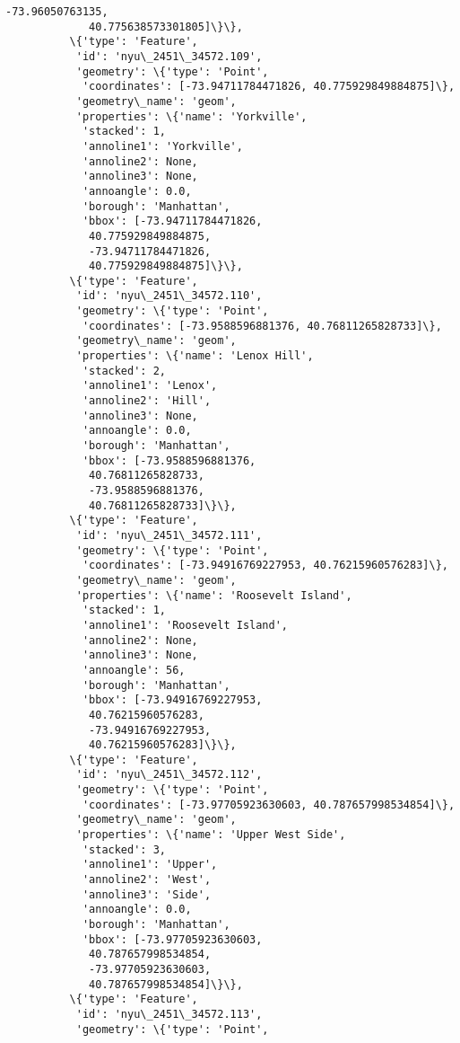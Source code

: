\documentclass[11pt]{article}
\begin{document}
\begin{Verbatim}[commandchars=\\\{\}]
             -73.96050763135,
             40.775638573301805]\}\},
          \{'type': 'Feature',
           'id': 'nyu\_2451\_34572.109',
           'geometry': \{'type': 'Point',
            'coordinates': [-73.94711784471826, 40.775929849884875]\},
           'geometry\_name': 'geom',
           'properties': \{'name': 'Yorkville',
            'stacked': 1,
            'annoline1': 'Yorkville',
            'annoline2': None,
            'annoline3': None,
            'annoangle': 0.0,
            'borough': 'Manhattan',
            'bbox': [-73.94711784471826,
             40.775929849884875,
             -73.94711784471826,
             40.775929849884875]\}\},
          \{'type': 'Feature',
           'id': 'nyu\_2451\_34572.110',
           'geometry': \{'type': 'Point',
            'coordinates': [-73.9588596881376, 40.76811265828733]\},
           'geometry\_name': 'geom',
           'properties': \{'name': 'Lenox Hill',
            'stacked': 2,
            'annoline1': 'Lenox',
            'annoline2': 'Hill',
            'annoline3': None,
            'annoangle': 0.0,
            'borough': 'Manhattan',
            'bbox': [-73.9588596881376,
             40.76811265828733,
             -73.9588596881376,
             40.76811265828733]\}\},
          \{'type': 'Feature',
           'id': 'nyu\_2451\_34572.111',
           'geometry': \{'type': 'Point',
            'coordinates': [-73.94916769227953, 40.76215960576283]\},
           'geometry\_name': 'geom',
           'properties': \{'name': 'Roosevelt Island',
            'stacked': 1,
            'annoline1': 'Roosevelt Island',
            'annoline2': None,
            'annoline3': None,
            'annoangle': 56,
            'borough': 'Manhattan',
            'bbox': [-73.94916769227953,
             40.76215960576283,
             -73.94916769227953,
             40.76215960576283]\}\},
          \{'type': 'Feature',
           'id': 'nyu\_2451\_34572.112',
           'geometry': \{'type': 'Point',
            'coordinates': [-73.97705923630603, 40.787657998534854]\},
           'geometry\_name': 'geom',
           'properties': \{'name': 'Upper West Side',
            'stacked': 3,
            'annoline1': 'Upper',
            'annoline2': 'West',
            'annoline3': 'Side',
            'annoangle': 0.0,
            'borough': 'Manhattan',
            'bbox': [-73.97705923630603,
             40.787657998534854,
             -73.97705923630603,
             40.787657998534854]\}\},
          \{'type': 'Feature',
           'id': 'nyu\_2451\_34572.113',
           'geometry': \{'type': 'Point',

\end{Verbatim}
\end{document}
